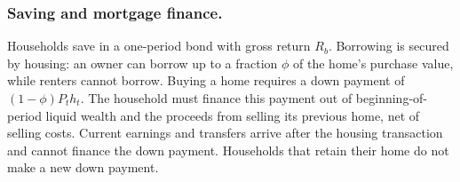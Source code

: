 \subsubsection*{Saving and mortgage finance.}
Households save in a one-period bond with gross return $R_b$. Borrowing is
secured by housing: an owner can borrow up to a fraction $\phi$ of the
home's purchase value, while renters cannot borrow. Buying a home requires
a down payment of $(1-\phi)P_t h_t$. The household must finance this payment
out of beginning-of-period liquid wealth and the proceeds from selling its
previous home, net of selling costs. Current earnings and transfers arrive
after the housing transaction and cannot finance the down payment.
Households that retain their home do not make a new down payment.
